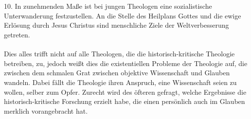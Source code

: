 \\ ~ \\
10. In zunehmenden Maße ist bei jungen Theologen eine sozialistische Unterwanderung festzustellen.  An die Stelle des Heilplans Gottes und die ewige Erlösung durch Jesus Christus sind menschliche Ziele der Weltverbesserung getreten.
\\ ~ \\
Dies alles trifft nicht auf alle Theologen, die die historisch-kritische Theologie betreiben, zu, jedoch weißt dies die existentiellen Probleme der Theologie auf, die zwischen dem schmalen Grat zwischen objektive Wissenschaft und Glauben wandeln. Dabei fällt die Theologie ihren Anspruch, eine Wissenschaft seien zu wollen, selber zum Opfer. Zurecht wird des öfteren gefragt, welche Ergebnisse die historisch-kritische Forschung erzielt habe, die einen persönlich auch im Glauben merklich vorangebracht hat.        

